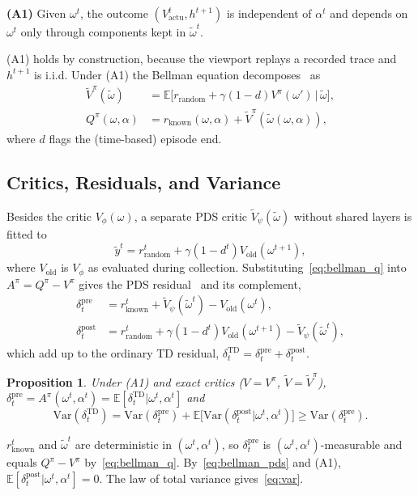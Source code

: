 \documentclass[conference]{IEEEtran}
\newtheorem{proposition}{Proposition}
\newcommand{\EE}{\mathbb{E}}
\newcommand{\om}{\omega}
\newcommand{\omt}{\widetilde{\omega}}
\newcommand{\Vt}{\widetilde{V}}
\newcommand{\rk}{r_{\mathrm{known}}}
\newcommand{\rr}{r_{\mathrm{random}}}
\newcommand{\Vact}{V_{\mathrm{actu}}}
\newcommand{\Vold}{V_{\mathrm{old}}}
\begin{document}
\noindent\textbf{(A1)} Given $\om^t$, the outcome $(\Vact^t,h^{t+1})$ is independent of $\alpha^t$ and depends on $\om^t$ only through components kept in $\omt^t$.

(A1) holds by construction, because the viewport replays a recorded trace and $h^{t+1}$ is i.i.d. Under (A1) the Bellman equation decomposes~\cite{powell2011adp,corra2025lowcomplexity} as
\begin{align}
\Vt^\pi(\omt)&=\EE\big[\rr+\gamma(1-d)V^\pi(\om')\,|\,\omt\big],\label{eq:bellman_pds}\\
Q^\pi(\om,\alpha)&=\rk(\om,\alpha)+\Vt^\pi(\omt(\om,\alpha)),\label{eq:bellman_q}
\end{align}
where $d$ flags the (time-based) episode end.

\subsection{Critics, Residuals, and Variance}
Besides the critic $V_\phi(\om)$, a separate PDS critic $\Vt_\psi(\omt)$ without shared layers is fitted to
\begin{equation}
\widetilde y^t=\rr^t+\gamma(1-d^t)\Vold(\om^{t+1}),
\label{eq:pds_target}
\end{equation}
where $\Vold$ is $V_\phi$ as evaluated during collection. Substituting~\eqref{eq:bellman_q} into $A^\pi=Q^\pi-V^\pi$ gives the PDS residual~\cite{lu2026resource} and its complement,
\begin{align}
\delta_t^{\mathrm{pre}}&=\rk^t+\Vt_\psi(\omt^t)-\Vold(\om^t),\label{eq:dpre}\\
\delta_t^{\mathrm{post}}&=\rr^t+\gamma(1-d^t)\Vold(\om^{t+1})-\Vt_\psi(\omt^t),\label{eq:dpost}
\end{align}
which add up to the ordinary TD residual, $\delta_t^{\mathrm{TD}}=\delta_t^{\mathrm{pre}}+\delta_t^{\mathrm{post}}$.

\begin{proposition}\label{prop:rb}
Under (A1) and exact critics ($V=V^\pi$, $\Vt=\Vt^\pi$), $\delta_t^{\mathrm{pre}}=A^\pi(\om^t,\alpha^t)=\EE[\delta_t^{\mathrm{TD}}|\om^t,\alpha^t]$ and
\begin{equation}
\mathrm{Var}(\delta_t^{\mathrm{TD}})=\mathrm{Var}(\delta_t^{\mathrm{pre}})+\EE\big[\mathrm{Var}(\delta_t^{\mathrm{post}}|\om^t,\alpha^t)\big]\ge\mathrm{Var}(\delta_t^{\mathrm{pre}}).
\label{eq:var}
\end{equation}
\end{proposition}
\begin{IEEEproof}
$\rk^t$ and $\omt^t$ are deterministic in $(\om^t,\alpha^t)$, so $\delta_t^{\mathrm{pre}}$ is $(\om^t,\alpha^t)$-measurable and equals $Q^\pi-V^\pi$ by~\eqref{eq:bellman_q}. By~\eqref{eq:bellman_pds} and (A1), $\EE[\delta_t^{\mathrm{post}}|\om^t,\alpha^t]=0$. The law of total variance gives~\eqref{eq:var}.
\end{IEEEproof}
\end{document}
